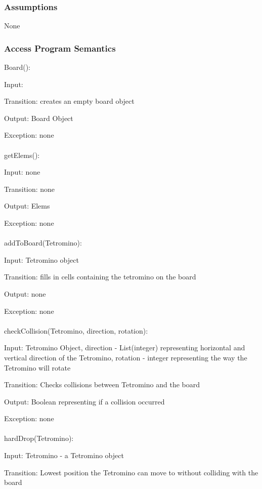 \documentclass[12,english]{article}
\begin{document}
			\subsubsection{Assumptions}
			None
			
			\subsubsection{Access Program Semantics}
			
			Board():
			
			Input: 
			
			Transition: creates an empty board object
		
			Output: Board Object
			
			Exception: none\\
			\\
			getElems():
			
			Input: none
			
			Transition: none
			
			Output: Elems
			
			Exception: none\\
	        \\			
			addToBoard(Tetromino):
			
			Input: Tetromino object
			
			Transition: fills in cells containing the tetromino on the board
			
			Output: none 
			
			Exception: none\\
			\\							
			checkCollision(Tetromino, direction, rotation):
			
			Input: Tetromino Object, direction - List(integer) representing horizontal and vertical direction of the Tetromino, rotation - integer representing the way the Tetromino will rotate 
			
			Transition: Checks collisions between Tetromino and the board
			
			Output: Boolean representing if a collision occurred
			
			Exception: none\\
			\\		
			
			hardDrop(Tetromino):
			
			Input: Tetromino - a Tetromino object 
			
			Transition: Lowest position the Tetromino can move to without colliding with the board
			
\end{document}
